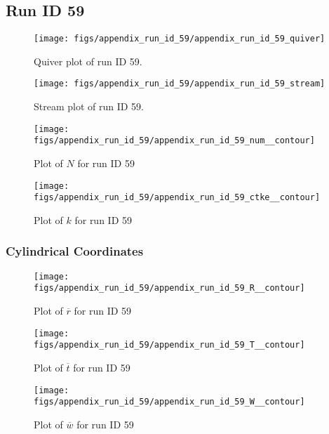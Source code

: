 \subsection{Run ID 59}
\begin{figure}[H]
\centering
\texttt{[image: figs/appendix\_run\_id\_59/appendix\_run\_id\_59\_quiver]}
\caption{Quiver plot of run ID 59.}
\label{fig:appendix_run_id_59_quiver}
\end{figure}


\begin{figure}[H]
\centering
\texttt{[image: figs/appendix\_run\_id\_59/appendix\_run\_id\_59\_stream]}
\caption{Stream plot of run ID 59.}
\label{fig:appendix_run_id_59_stream}
\end{figure}


\begin{figure}[H]
\centering
\texttt{[image: figs/appendix\_run\_id\_59/appendix\_run\_id\_59\_num\_\_contour]}
\caption{Plot of $N$ for run ID 59}
\label{fig:appendix_run_id_59_num__contour}
\end{figure}


\begin{figure}[H]
\centering
\texttt{[image: figs/appendix\_run\_id\_59/appendix\_run\_id\_59\_ctke\_\_contour]}
\caption{Plot of $k$ for run ID 59}
\label{fig:appendix_run_id_59_ctke__contour}
\end{figure}


\subsubsection{Cylindrical Coordinates}
\begin{figure}[H]
\centering
\texttt{[image: figs/appendix\_run\_id\_59/appendix\_run\_id\_59\_R\_\_contour]}
\caption{Plot of $\overline{r}$ for run ID 59}
\label{fig:appendix_run_id_59_R__contour}
\end{figure}


\begin{figure}[H]
\centering
\texttt{[image: figs/appendix\_run\_id\_59/appendix\_run\_id\_59\_T\_\_contour]}
\caption{Plot of $\overline{t}$ for run ID 59}
\label{fig:appendix_run_id_59_T__contour}
\end{figure}


\begin{figure}[H]
\centering
\texttt{[image: figs/appendix\_run\_id\_59/appendix\_run\_id\_59\_W\_\_contour]}
\caption{Plot of $\overline{w}$ for run ID 59}
\label{fig:appendix_run_id_59_W__contour}
\end{figure}


